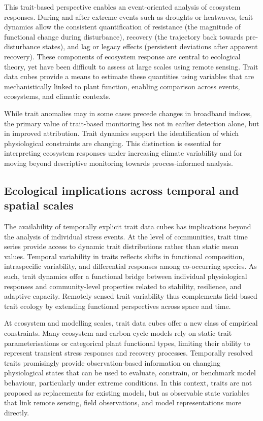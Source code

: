 \documentclass[pdflatex,sn-mathphys-num]{sn-jnl}%
\theoremstyle{thmstyleone}%
\theoremstyle{thmstyletwo}%
\theoremstyle{thmstylethree}%
\begin{document}
This trait-based perspective enables an event-oriented analysis of ecosystem responses. During and after extreme events such as droughts or heatwaves, trait dynamics allow the consistent quantification of resistance (the magnitude of functional change during disturbance), recovery (the trajectory back towards pre-disturbance states), and lag or legacy effects (persistent deviations after apparent recovery). These components of ecosystem response are central to ecological theory, yet have been difficult to assess at large scales using remote sensing. Trait data cubes provide a means to estimate these quantities using variables that are mechanistically linked to plant function, enabling comparison across events, ecosystems, and climatic contexts.

While trait anomalies may in some cases precede changes in broadband indices, the primary value of trait-based monitoring lies not in earlier detection alone, but in improved attribution. Trait dynamics support the identification of which physiological constraints are changing. This distinction is essential for interpreting ecosystem responses under increasing climate variability and for moving beyond descriptive monitoring towards process-informed analysis.

\subsection{Ecological implications across temporal and spatial scales}

The availability of temporally explicit trait data cubes has implications beyond the analysis of individual stress events. At the level of communities, trait time series provide access to dynamic trait distributions rather than static mean values. Temporal variability in traits reflects shifts in functional composition, intraspecific variability, and differential responses among co-occurring species. As such, trait dynamics offer a functional bridge between individual physiological responses and community-level properties related to stability, resilience, and adaptive capacity. Remotely sensed trait variability thus complements field-based trait ecology by extending functional perspectives across space and time.

At ecosystem and modelling scales, trait data cubes offer a new class of empirical constraints. Many ecosystem and carbon cycle models rely on static trait parameterisations or categorical plant functional types, limiting their ability to represent transient stress responses and recovery processes. Temporally resolved traits promisingly provide observation-based information on changing physiological states that can be used to evaluate, constrain, or benchmark model behaviour, particularly under extreme conditions. In this context, traits are not proposed as replacements for existing models, but as observable state variables that link remote sensing, field observations, and model representations more directly.
\end{document}
